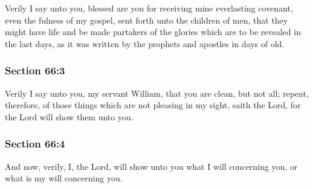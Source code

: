 		Verily I say unto you, blessed are you for receiving mine everlasting covenant, even the fulness of my gospel, sent forth unto the children of men, that they might have life and be made partakers of the glories which are to be revealed in the last days, as it was written by the prophets and apostles in days of old.


	\subsubsection{Section 66:3} %
		\label{DC66-3}

		Verily I say unto you, my servant William, that you are clean, but not all; repent, therefore, of those things which are not pleasing in my sight, saith the Lord, for the Lord will show them unto you.


	\subsubsection{Section 66:4} %
		\label{DC66-4}

		And now, verily, I, the Lord, will show unto you what I will concerning you, or what is my will concerning you.


